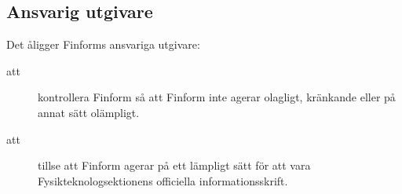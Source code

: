 \documentclass[a4paper]{article}
\begin{document}
\begin{foreningenv}{\forening{}}
    \subsection{Ansvarig utgivare}
    Det åligger Finforms ansvariga utgivare:
    \begin{description}
        \item[att] kontrollera Finform så att Finform inte agerar olagligt, kränkande eller på annat sätt olämpligt.
        \item[att] tillse att Finform agerar på ett lämpligt sätt för att vara Fysikteknologsektionens officiella informationsskrift.
    \end{description}
\end{foreningenv}
\end{document}
